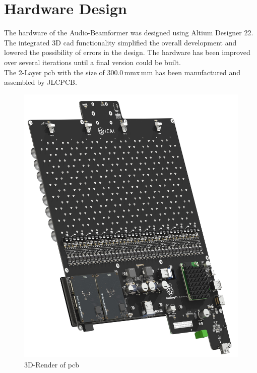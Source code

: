\newpage
\section{Hardware Design}
The hardware of the Audio-Beamformer was designed using Altium Designer 22. The integrated 3D \acrshort{cad} functionality simplified the overall development and lowered the possibility of errors in the design.
The hardware has been improved over several iterations until a final version could be built.\\
The 2-Layer \acrfull{pcb} with the size of 300.0\,mm\;x\,mm has been manufactured and assembled by JLCPCB.\\

\begin{figure}[h!]
	\centering
	\includegraphics[width=14cm]{images/4_Design/Hardware/Audio-Beamformer_PCB.jpg}
	\vspace{-0.2cm}
    \caption{3D-Render of \acrshort{pcb}}
    \label{fig:pcb_render}
\end{figure}
\newpage

